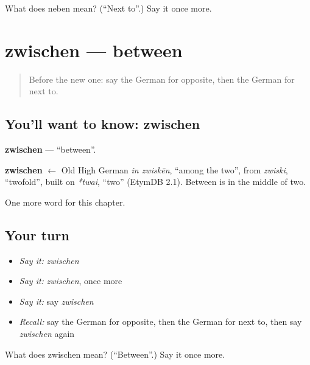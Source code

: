 \begin{tcolorbox}[breakable,colback=teal!4,colframe=teal!35!black,title={Before you move on}]
What does neben mean? (\textquotedblleft{}Next to\textquotedblright{}.) Say it once more.
\end{tcolorbox}
\section[zwischen]{zwischen — between}

\label{lesson:GE-C110-zwischen}



\begin{quote}
Before the new one: say the German for opposite, then the German for next to.
\end{quote}

\subsection*{You'll want to know: zwischen}
\textbf{zwischen} — \textquotedblleft{}between\textquotedblright{}.

\begin{cousinweb}
\textbf{zwischen} $\leftarrow$ Old High German \emph{in zwiskēn}, \textquotedblleft{}among the two\textquotedblright{}, from \emph{zwiski}, \textquotedblleft{}twofold\textquotedblright{}, built on \emph{*twai}, \textquotedblleft{}two\textquotedblright{} (EtymDB 2.1). Between is in the middle of two.
\end{cousinweb}

\begin{grammarlens}[title={What you've built}]
One more word for this chapter.
\end{grammarlens}

\subsection*{Your turn}
\begin{itemize}
\raggedright
  \item \emph{Say it:} \emph{zwischen}
  \item \emph{Say it:} \emph{zwischen}, once more
  \item \emph{Say it:} say \emph{zwischen}
  \item \emph{Recall:} say the German for opposite, then the German for next to, then say \emph{zwischen} again
\end{itemize}

\begin{tcolorbox}[breakable,colback=teal!4,colframe=teal!35!black,title={Before you move on}]
What does zwischen mean? (\textquotedblleft{}Between\textquotedblright{}.) Say it once more.
\end{tcolorbox}
